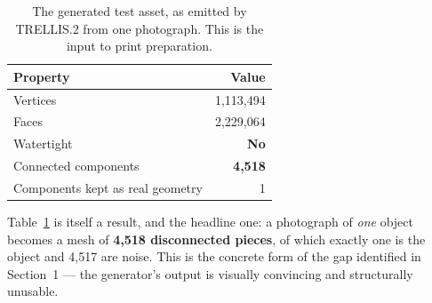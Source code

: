 \documentclass[11pt,a4paper]{article}
\begin{document}
\begin{table}[h]
\centering
\caption{The generated test asset, as emitted by TRELLIS.2 from one
photograph. This is the input to print preparation.}
\label{tab:input}
\begin{tabular}{lr}
\toprule
\textbf{Property} & \textbf{Value} \\
\midrule
Vertices                     & 1{,}113{,}494 \\
Faces                        & 2{,}229{,}064 \\
Watertight                   & \textcolor{kaorange}{\textbf{No}} \\
Connected components         & \textcolor{kaorange}{\textbf{4{,}518}} \\
Components kept as real geometry & 1 \\
\bottomrule
\end{tabular}
\end{table}

\noindent
Table~\ref{tab:input} is itself a result, and the headline one: a photograph of
\emph{one} object becomes a mesh of \textbf{4{,}518 disconnected pieces}, of
which exactly one is the object and 4{,}517 are noise. This is the concrete
form of the gap identified in Section~1 --- the generator's output is
visually convincing and structurally unusable.
\end{document}
